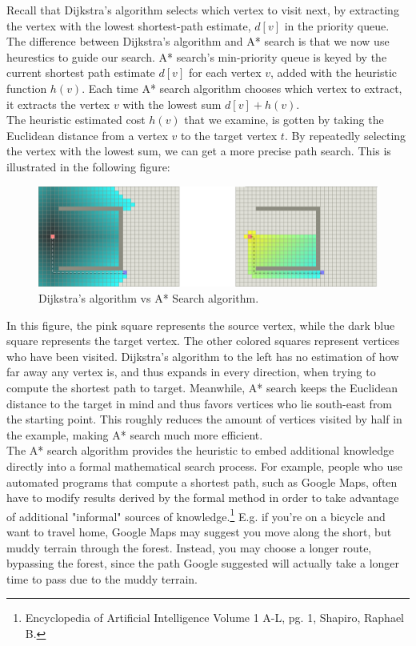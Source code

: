 \documentclass[11pt]{article}
\begin{document}
\noindent Recall that Dijkstra's algorithm selects which vertex to visit next, by extracting the vertex with the lowest shortest-path estimate, $d[v]$ in the priority queue. The difference between Dijkstra's algorithm and A* search is that we now use heurestics to guide our search. A* search's min-priority queue is keyed by the current shortest path estimate $d[v]$ for each vertex $v$, added with the heuristic function $h(v)$. Each time A* search algorithm chooses which vertex to extract, it extracts the vertex $v$ with the lowest sum $d[v]+h(v)$.\\

\noindent  The heuristic estimated cost $h(v)$ that we examine, is gotten by taking the Euclidean distance from a vertex $v$ to the target vertex $t$. By repeatedly selecting the vertex with the lowest sum, we can get a more precise path search. This is illustrated in the following figure:\\

\begin{figure}[H]
\centering
\includegraphics[scale=0.45]{Pictures/Comparison2.png}
\caption[]{Dijkstra's algorithm  vs  A* Search algorithm.\footnotemark}
\end{figure}

\noindent In this figure, the pink square represents the source vertex, while the dark blue square represents the target vertex. The other colored squares represent vertices who have been visited. Dijkstra's algorithm to the left has no estimation of how far away any vertex is, and thus expands in every direction, when trying to compute the shortest path to target. Meanwhile, A* search keeps the Euclidean distance to the target in mind and thus favors vertices who lie south-east from the starting point. This roughly reduces the amount of vertices visited by half in the example, making A* search much more efficient.\\

\noindent The A* search algorithm provides the heuristic to embed additional knowledge directly into a formal mathematical search process. For example, people who use automated programs that compute a shortest path, such as Google Maps, often have to modify results derived by the formal method in order to take advantage of additional "informal" sources of knowledge.\footnote{Encyclopedia of Artificial Intelligence Volume 1 A-L, pg. 1, Shapiro, Raphael B.} E.g. if you're on a bicycle and want to travel home, Google Maps may suggest you move along the short, but muddy terrain through the forest. Instead, you may choose a longer route, bypassing the forest, since the path Google suggested will actually take a longer time to pass due to the muddy terrain. 
\end{document}
